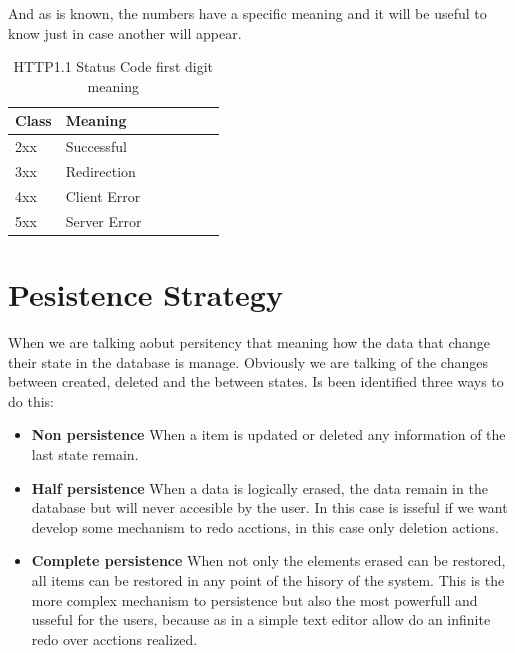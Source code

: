 \noindent And as is known, the numbers have a specific meaning and it will
be useful to know just in case another will appear.

\begin{table}[H]
\centering

\begin{tabular}{@{}lllllll@{}}

Class & Meaning\\
\midrule

2xx & Successful\\
3xx & Redirection\\
4xx & Client Error\\
5xx & Server Error\\

\end{tabular}
\caption{HTTP1.1 Status Code first digit meaning}
\label{my-label}
\end{table}


\section{Pesistence Strategy}

When we are talking aobut persitency that meaning how the data that change
their state in the database is manage. Obviously we are talking of the changes
between created, deleted and the between states.
\intro
Is been identified three ways to do this:

\begin{itemize}
  \setlength{\itemsep}{0pt}
\item \textbf{Non persistence}
      \intro
      When a item is updated or deleted any information of the last state remain.
      \intro
\item \textbf{Half persistence}
      \intro
      When a data is logically erased, the data remain in the database but will never
      accesible by the user. In this case is isseful if we want develop some mechanism
      to redo acctions, in this case only deletion actions.
      \intro
\item \textbf{Complete persistence}
      \intro
      When not only the elements erased can be restored, all items can be restored in
      any point of the hisory of the system. This is the more complex mechanism to persistence
      but also the most powerfull and usseful for the users, because as in a simple
      text editor allow do an infinite redo over acctions realized.

\end{itemize}

